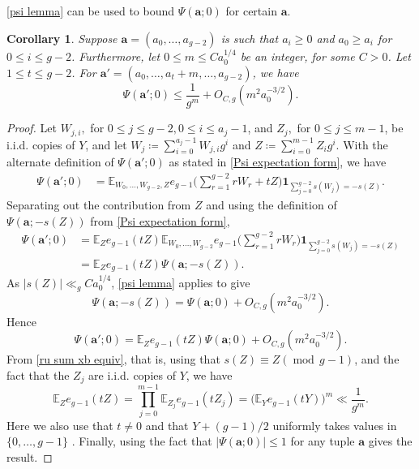 \documentclass[hidelinks,11pt,reqno]{amsart}
\renewcommand{\leq}{\leqslant}
\renewcommand{\geq}{\geqslant}
\newcommand{\E}{\ensuremath{\mathbb{E}}}
\newcommand{\ind}{\mathbf{1}}
\newcommand{\ru}[1]{e_{g-1}(#1)}
\newcommand{\Ru}[1]{e_{g-1}\Big(#1\Big)}
\newcommand{\sx}[1]{s(#1)}
\newtheorem{cor}[prop]{Corollary}
\theoremstyle{remark}
\newcommand{\md}[1]{\ensuremath{(\operatorname{mod}\, #1)}}
\begin{document}
\cref{psi lemma} can be used to bound $\Psi(\mathbf{a};0)$ for certain $\mathbf{a}$. 
\begin{cor}\label{psi 0 bound}
    Suppose $\mathbf{a}=(a_{0},\ldots, a_{g-2})$ is such that $a_{i}\geq 0$ and $a_{0}\geq a_{i}$ for $0\leq i\leq g-2$. Furthermore, let $0\leq m\leq Ca_{0}^{1/4}$ be an integer, for some $C>0$. Let $1\leq t \leq g-2$. For $\mathbf{a}'=(a_{0},\ldots, a_{t}+m,\ldots,a_{g-2})$, we have
    \[\Psi(\mathbf{a}';0)\leq \frac{1}{g^{m}}+O_{C,g}(m^{2}a_{0}^{-3/2}).\]
\end{cor}
\begin{proof}
Let $W_{j,i}, $ for $ 0\leq j\leq g-2, 0\leq i\leq a_{j}-1 $, and $Z_{j}, $ for $0\leq j\leq m-1$, be i.i.d. copies of $Y$, and let $W_{j}\coloneq \sum_{i=0}^{a_{j}-1}W_{j,i}g^{i}$ and $Z\coloneq \sum_{i=0}^{m-1}Z_{i}g^{i}$. With the alternate definition of $\Psi(\mathbf{a}';0)$ as stated in \cref{Psi expectation form}, we have
    \begin{align*}
        \Psi(\mathbf{a}';0)&=\E_{W_{0},\ldots, W_{g-2},Z}\Ru{\sum_{r=1}^{g-2}r W_{r}+tZ}\ind_{\sum_{j=0}^{g-2}\sx{W_{j}}=-\sx{Z}}.\end{align*}
        Separating out the contribution from $Z$ and using the definition of $\Psi(\mathbf{a};-\sx{Z})$ from \cref{Psi expectation form},
\begin{align*}
      \Psi(\mathbf{a}';0)&=\E_{Z}\ru{tZ}\E_{W_{0},\ldots, W_{g-2}}\Ru{\sum_{r=1}^{g-2}rW_{r}}\ind_{\sum_{j=0}^{g-2}\sx{W_{j}}=-\sx{Z}}\\
      &=\E_{Z}\ru{tZ}\Psi(\mathbf{a};-\sx{Z}).
\end{align*}
As $|\sx{Z}|\ll_{g} Ca_{0}^{1/4}$, \cref{psi lemma} applies to give
    \[\Psi(\mathbf{a};-\sx{Z})=\Psi(\mathbf{a};0)+O_{C,g}(m^{2}a_{0}^{-3/2}).\]
    Hence
    \[ \Psi(\mathbf{a}';0)=\E_{Z}\ru{tZ}\Psi(\mathbf{a};0)+O_{C,g}(m^{2}a_{0}^{-3/2}).\]
From \cref{ru sum xb equiv}, that is, using that $\sx{Z}\equiv Z\md{g-1}$, and the fact that the $Z_{j}$ are i.i.d. copies of $Y$, we have
    \[\E_{Z}\ru{tZ}=\prod_{j=0}^{m-1}\E_{Z_{j}}\ru{tZ_{j}}=\Big (\E_{Y}\ru{tY}\Big )^{m}\ll \frac{1}{g^{m}}.\]
    Here we also use that $t\neq 0$ and that $Y+(g-1)/2$ uniformly takes values in $\{0,\ldots, g-1\}$ . Finally, using the fact that $|\Psi(\mathbf{a};0)|\leq 1$ for any tuple $\mathbf{a}$ gives the result.
\end{proof}
\end{document}
